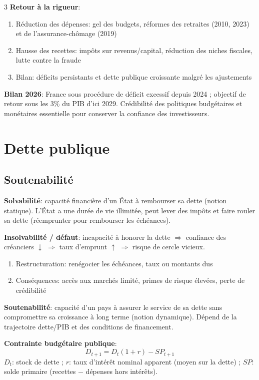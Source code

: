 \documentclass[12pt, a4paper]{article}
\begin{document}
\begin{multicols*}{3}
\textbf{Retour à la rigueur}:
\begin{enumerate}[\roman*.]
  \item Réduction des dépenses: gel des budgets, réformes des retraites (2010, 2023) et de l'assurance-chômage (2019)
  \item Hausse des recettes: impôts sur revenus/capital, réduction des niches fiscales, lutte contre la fraude
  \item Bilan: déficits persistants et dette publique croissante malgré les ajustements
\end{enumerate}

\textbf{Bilan 2026}: France sous procédure de déficit excessif depuis 2024 ; objectif de retour sous les $3\%$ du PIB d'ici 2029. Crédibilité des politiques budgétaires et monétaires essentielle pour conserver la confiance des investisseurs.

\colbreak
\section{Dette publique}

\subsection{Soutenabilité}

\textbf{Solvabilité}: capacité financière d'un État à rembourser sa dette (notion statique). L'État a une durée de vie illimitée, peut lever des impôts et faire rouler sa dette (réemprunter pour rembourser les échéances).

\textbf{Insolvabilité / défaut}: incapacité à honorer la dette $\Rightarrow$ confiance des créanciers $\downarrow$ $\Rightarrow$ taux d'emprunt $\uparrow$ $\Rightarrow$ risque de cercle vicieux.
\begin{enumerate}[\roman*.]
  \item Restructuration: renégocier les échéances, taux ou montants dus
  \item Conséquences: accès aux marchés limité, primes de risque élevées, perte de crédibilité
\end{enumerate}

\textbf{Soutenabilité}: capacité d'un pays à assurer le service de sa dette sans compromettre sa croissance à long terme (notion dynamique). Dépend de la trajectoire dette/PIB et des conditions de financement.

\textbf{Contrainte budgétaire publique}:
\[
\boxed{D_{t+1}=D_t(1+r)-SP_{t+1}}
\]
$D_t$: stock de dette ; $r$: taux d'intérêt nominal apparent (moyen sur la dette) ; $SP$: solde primaire (recettes $-$ dépenses hors intérêts).


\end{multicols*}
\end{document}
